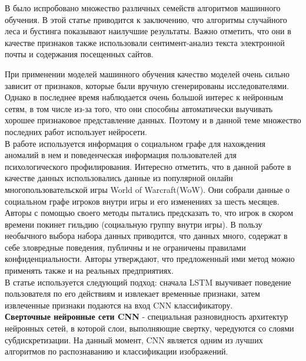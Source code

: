 В \cite{noeverClassifierSuitesInsider2019} было испробовано множество различных семейств алгоритмов машинного обучения. В этой статье приводится к заключению, что алгоритмы случайного леса и бустинга показывают наилучшие результаты. Важно отметить, что они в качестве признаков также использовали сентимент-анализ текста электронной почты и содержания посещенных сайтов.

При применении моделей машинного обучения качество моделей очень сильно зависит от признаков, которые были вручную сгенерированы исследователями. Однако в последнее время наблюдается очень большой интерес к нейронным сетям, в том числе из-за того, что они способны автоматически выучивать хорошее признаковое представление данных. Поэтому и в данной теме множество последних работ использует нейросети.\\

В работе \cite{brdiczkaProactiveInsiderThreat2012b} используется информация о социальном графе для нахождения аномалий в нем и поведенческая информация пользователей для психологического профилирования. Интересно отметить, что в данной работе в качестве данных использовались данные из популярной онлайн многопользовательской игры World of Warcraft(WoW). Они собрали данные о социальном графе игроков внутри игры и его изменениях за шесть месяцев. Авторы с помощью своего методы пытались предсказать то, что игрок в скором времени покинет гильдию (социальную группу внутри игры). В пользу необычного выбора набора данных приводится, что данных много, содержат в себе зловредные поведения, публичны и не ограничены правилами конфиденциальности. Авторы утверждают, что предложенный ими метод можно применять также и на реальных предприятиях.\\

В статье \cite{yuanInsiderThreatDetection2018b} используется следующий подход: сначала LSTM выучивает поведение пользователя по его действиям и извлекает временные признаки, затем извлеченные признаки подаются на вход CNN классификатору.\\

\textbf{Сверточные нейронные сети CNN} - специальная разновидность архитектур нейронных сетей, в которой слои, выполняющие свертку, чередуются со слоями субдискретизации. На данный момент, CNN является одним из лучших алгоритмов по распознаванию и классификации изображений.\\

